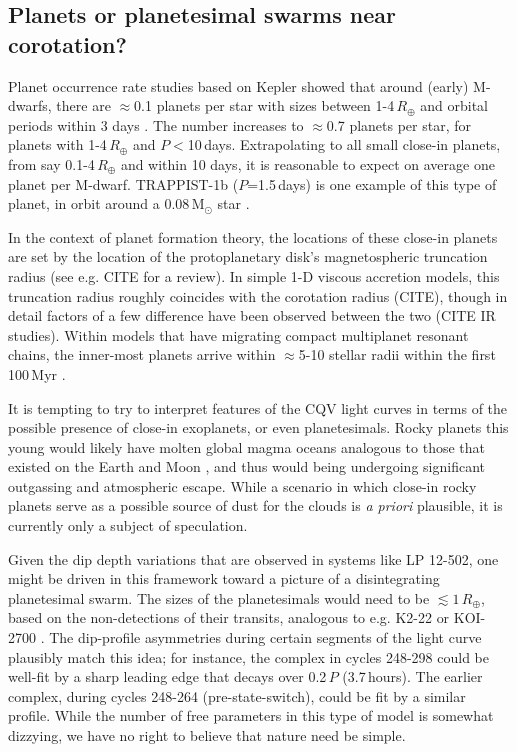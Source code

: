 \documentclass[11pt,twocolumn,tighten]{aastex63}
\begin{document}
\subsection{Planets or planetesimal swarms near corotation?}

Planet occurrence rate studies based on Kepler showed that around
(early) M-dwarfs, there are $\approx$0.1 planets per star with sizes
between 1-4\,$R_\oplus$ and orbital periods within 3 days
\citep{2015ApJ...807...45D}.  The number increases to $\approx$0.7
planets per star, for planets with 1-4\,$R_\oplus$ and $P$$<$10\,days.
Extrapolating to all small close-in planets, from say
0.1-4\,$R_\oplus$ and within 10 days, it is reasonable to expect on
average one planet per M-dwarf.  TRAPPIST-1b ($P$=1.5\,days) is one
example of this type of planet, in orbit around a 0.08\,M$_\odot$ star
\citep{2017Natur.542..456G}.

In the context of planet formation theory, the locations of these
close-in planets are set by the location of the protoplanetary disk's
magnetospheric truncation radius (see e.g. CITE for a review).  In
simple 1-D viscous accretion models, this truncation radius roughly
coincides with the corotation radius (CITE), though in detail factors
of a few difference have been observed between the two (CITE IR
studies).  Within models that have migrating compact multiplanet
resonant chains, the inner-most planets arrive within $\approx$5-10
stellar radii within the first 100\,Myr \citep{2018haex.bookE.142I}.

It is tempting to try to interpret features of the CQV light curves in
terms of the possible presence of close-in exoplanets, or even
planetesimals.  Rocky planets this young would likely have molten
global magma oceans analogous to those that existed on the Earth and
Moon \citep[see][]{2022arXiv220310023L}, and thus would being
undergoing significant outgassing and atmospheric escape.  While a
scenario in which close-in rocky planets serve as a possible source of
dust for the clouds is {\it a priori} plausible, it is currently only
a subject of speculation.

Given the dip depth variations that are observed in systems like LP
12-502, one might be driven in this framework toward a picture of a
disintegrating planetesimal swarm.  The sizes of the planetesimals
would need to be $\lesssim 1$\,$R_\oplus$, based on the non-detections
of their transits, analogous to e.g.  K2-22
\citep{2015ApJ...812..112S} or KOI-2700 \citep{2014ApJ...784...40R}.
The dip-profile asymmetries during certain segments of the light curve
plausibly match this idea; for instance, the complex in cycles 248-298
could be well-fit by a sharp leading edge that decays over 0.2\,$P$
(3.7\,hours).  The earlier complex, during cycles 248-264
(pre-state-switch), could be fit by a similar profile.  While the
number of free parameters in this type of model is somewhat dizzying,
we have no right to believe that nature need be simple.
\end{document}
